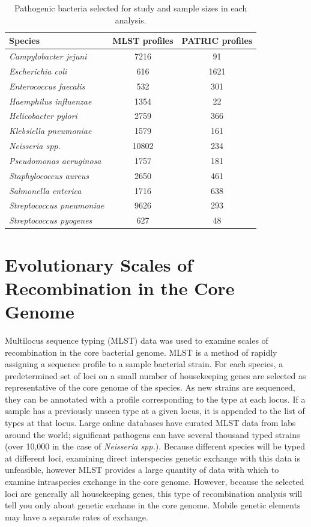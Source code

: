 \begin{table}
\centering
\caption{Pathogenic bacteria selected for study and sample sizes in each analysis.}
\begin{tabularx}{\textwidth}{Xcc}
\toprule
Species & \hspace{10mm}MLST profiles\hspace{10mm} & PATRIC profiles \\
\midrule
\emph{Campylobacter jejuni}      & 7216  & 91 \\
\emph{Escherichia coli}          & 616   & 1621 \\
\emph{Enterococcus faecalis}     & 532   & 301 \\
\emph{Haemphilus influenzae}     & 1354  & 22 \\
\emph{Helicobacter pylori}       & 2759  & 366 \\
\emph{Klebsiella pneumoniae}     & 1579  & 161 \\
\emph{Neisseria spp.}            & 10802 & 234 \\
\emph{Pseudomonas aeruginosa}    & 1757  & 181 \\
\emph{Staphylococcus aureus}     & 2650  & 461 \\
\emph{Salmonella enterica}       & 1716  & 638 \\
\emph{Streptococcus pneumoniae}  & 9626  & 293 \\
\emph{Streptococcus pyogenes}    & 627   & 48 \\
\bottomrule
\end{tabularx}
\label{table:samplesizes}
\end{table}

\section{Evolutionary Scales of Recombination in the Core Genome}
\label{subsec:mlst}
%
Multilocus sequence typing (MLST) data was used to examine scales of recombination in the core bacterial genome.
MLST is a method of rapidly assigning a sequence profile to a sample bacterial strain.
For each species, a predetermined set of loci on a small number of housekeeping genes are selected as representative of the core genome of the species.
As new strains are sequenced, they can be annotated with a profile corresponding to the type at each locus.
If a sample has a previously unseen type at a given locus, it is appended to the list of types at that locus.
Large online databases have curated MLST data from labs around the world; significant pathogens can have several thousand typed strains (over 10,000 in the case of \emph{Neisseria spp.}).
Because different species will be typed at different loci, examining direct interspecies genetic exchange with this data is unfeasible, however MLST provides a large quantity of data with which to examine intraspecies exchange in the core genome.
However, because the selected loci are generally all housekeeping genes, this type of recombination analysis will tell you only about genetic exchane in the core genome.
Mobile genetic elements may have a separate rates of exchange.

